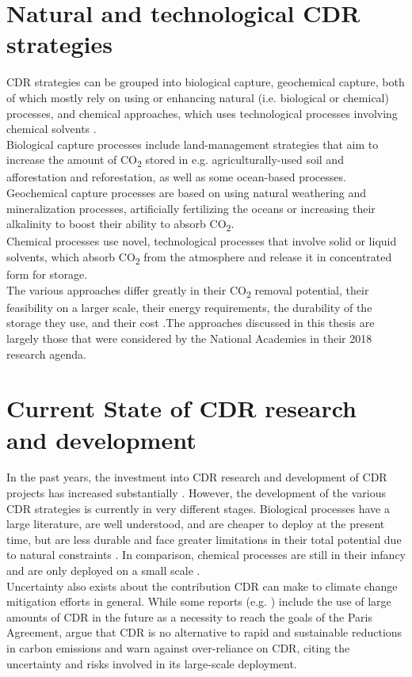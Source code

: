 \section{Natural and technological CDR strategies}
CDR strategies can be grouped into biological capture, geochemical capture, both of which mostly rely on using or enhancing natural (i.e. biological or chemical) processes, and chemical approaches, which uses technological processes involving chemical solvents \parencite{Smith2023TheEdition}.\\
Biological capture processes include land-management strategies that aim to increase the amount of CO\textsubscript{2} stored in e.g. agriculturally-used soil and afforestation and reforestation, as well as some ocean-based processes.\\
Geochemical capture processes are based on using natural weathering and mineralization processes, artificially fertilizing the oceans or increasing their alkalinity to boost their ability to absorb CO\textsubscript{2}.\\
Chemical processes use novel, technological processes that involve solid or liquid solvents, which absorb CO\textsubscript{2} from the atmosphere and release it in concentrated form for storage.\\
The various approaches differ greatly in their CO\textsubscript{2} removal potential, their feasibility on a larger scale, their energy requirements, the durability of the storage they use, and their cost \parencite[Chapter 8]{NAS2018NegativeAgenda}.The approaches discussed in this thesis are largely those that were considered by the National Academies in their 2018 research agenda.
\section{Current State of CDR research and development}
In the past years, the investment into CDR research and development of CDR projects has increased substantially \parencite[11]{Smith2023TheEdition}. However, the development of the various CDR strategies is currently in very different stages. Biological processes have a large literature, are well understood, and are cheaper to deploy at the present time, but are less durable and face greater limitations in their total potential due to natural constraints \parencite{Fuss2018NegativeEffects}. In comparison, chemical processes are still in their infancy and are only deployed on a small scale \parencite[24]{Smith2023TheEdition}.\\
Uncertainty also exists about the contribution CDR can make to climate change mitigation efforts in general. While some reports (e.g. \textcite{NAS2018NegativeAgenda}) include the use of large amounts of CDR in the future as a necessity to reach the goals of the Paris Agreement, \textcite{Fuss2018NegativeEffects} argue that CDR is no alternative to rapid and sustainable reductions in carbon emissions and warn against over-reliance on CDR, citing the uncertainty and risks involved in its large-scale deployment.\\
